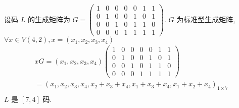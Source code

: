 \begin{example}
 设码 $ L $ 的生成矩阵为 $ G=\left(\begin{array}{llll|lll}1 & 0 & 0 & 0 & 0 & 1 & 1 \\ 0 & 1 & 0 & 0 & 1 & 0 & 1 \\ 0 & 0 & 1 & 0 & 1 & 1 & 0 \\ 0 & 0 & 0 & 1 & 1 & 1 & 1\end{array}\right) $. 
$ G $ 为标准型生成矩阵, $\forall x \in V(4,2), x=\left(x_{1}, x_{2}, x_{3}, x_{4}\right)$
$$
\begin{array}{l}
x G=\left(x_{1}, x_{2}, x_{3}, x_{4}\right)\left(\begin{array}{lllllll}
1 & 0 & 0 & 0 & 0 & 1 & 1 \\
0 & 1 & 0 & 0 & 1 & 0 & 1 \\
0 & 0 & 1 & 0 & 1 & 1 & 0 \\
0 & 0 & 0 & 1 & 1 & 1 & 1
\end{array}\right) \\
=\left(x_{1}, x_{2}, x_{3}, x_{4}, x_{2}+x_{3}+x_{4}, x_{1}+x_{3}+x_{4}, x_{1}+x_{2}+x_{4}\right)_{1 \times 7} \\
\end{array}
$$
$ L $ 是 $ [7,4] $ 码.
\end{example}
